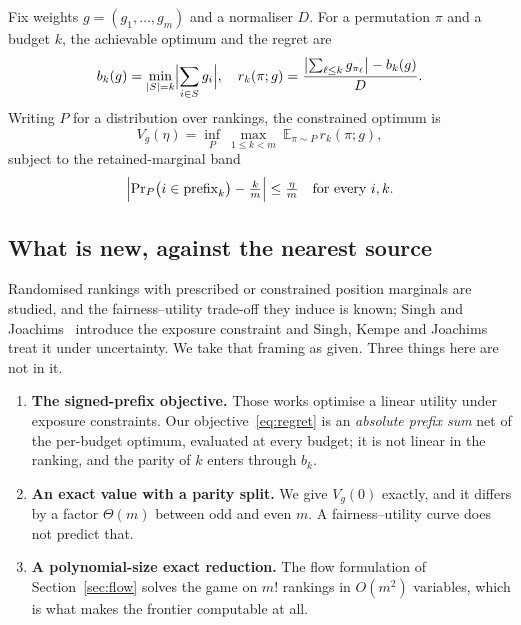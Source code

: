 Fix weights $g=(g_{1},\dots,g_{m})$ and a normaliser $D$. For a permutation $\pi$ and a
budget $k$, the achievable optimum and the regret are
\begin{equation}
b_{k}(g)=\min_{|S|=k}\Bigl|\sum_{i\in S}g_{i}\Bigr|,\quad
r_{k}(\pi;g)=\frac{\bigl|\sum_{\ell\le k}g_{\pi_{\ell}}\bigr|-b_{k}(g)}{D}.
\label{eq:regret}
\end{equation}
Writing $P$ for a distribution over rankings, the constrained optimum is
\begin{equation}
V_{g}(\eta)=\inf_{P}\ \max_{1\le k<m}\ \mathbb{E}_{\pi\sim P}\,r_{k}(\pi;g),
\label{eq:value}
\end{equation}
subject to the retained-marginal band
\begin{equation}
\Bigl|\Pr\nolimits_{P}\bigl(i\in\mathrm{prefix}_{k}\bigr)-\tfrac{k}{m}\Bigr|\le\tfrac{\eta}{m}
\quad\text{for every }i,k.
\label{eq:band}
\end{equation}


\subsection{What is new, against the nearest source}

Randomised rankings with prescribed or constrained position marginals are studied, and the
fairness--utility trade-off they induce is known; Singh and Joachims~\cite{singh2018}
introduce the exposure constraint and Singh, Kempe and Joachims~\cite{singh2021} treat it
under uncertainty. We take that framing as given. Three things here are not in it.

\begin{enumerate}
\item[1)] \textbf{The signed-prefix objective.} Those works optimise a linear utility under
exposure constraints. Our objective~\eqref{eq:regret} is an \emph{absolute prefix sum} net
of the per-budget optimum, evaluated at every budget; it is not linear in the ranking, and
the parity of $k$ enters through $b_{k}$.
\item[2)] \textbf{An exact value with a parity split.} We give $V_{g}(0)$ exactly, and it
differs by a factor $\Theta(m)$ between odd and even $m$. A fairness--utility curve does not
predict that.
\item[3)] \textbf{A polynomial-size exact reduction.} The flow formulation of
Section~\ref{sec:flow} solves the game on $m!$ rankings in $O(m^{2})$ variables, which is
what makes the frontier computable at all.
\end{enumerate}

